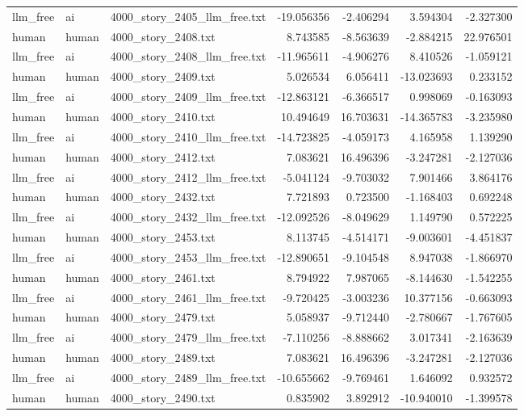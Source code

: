 \begin{longtable}{lllrrrr}
llm\_free & ai & 4000\_story\_2405\_llm\_free.txt & -19.056356 & -2.406294 & 3.594304 & -2.327300 \\
human & human & 4000\_story\_2408.txt & 8.743585 & -8.563639 & -2.884215 & 22.976501 \\
llm\_free & ai & 4000\_story\_2408\_llm\_free.txt & -11.965611 & -4.906276 & 8.410526 & -1.059121 \\
human & human & 4000\_story\_2409.txt & 5.026534 & 6.056411 & -13.023693 & 0.233152 \\
llm\_free & ai & 4000\_story\_2409\_llm\_free.txt & -12.863121 & -6.366517 & 0.998069 & -0.163093 \\
human & human & 4000\_story\_2410.txt & 10.494649 & 16.703631 & -14.365783 & -3.235980 \\
llm\_free & ai & 4000\_story\_2410\_llm\_free.txt & -14.723825 & -4.059173 & 4.165958 & 1.139290 \\
human & human & 4000\_story\_2412.txt & 7.083621 & 16.496396 & -3.247281 & -2.127036 \\
llm\_free & ai & 4000\_story\_2412\_llm\_free.txt & -5.041124 & -9.703032 & 7.901466 & 3.864176 \\
human & human & 4000\_story\_2432.txt & 7.721893 & 0.723500 & -1.168403 & 0.692248 \\
llm\_free & ai & 4000\_story\_2432\_llm\_free.txt & -12.092526 & -8.049629 & 1.149790 & 0.572225 \\
human & human & 4000\_story\_2453.txt & 8.113745 & -4.514171 & -9.003601 & -4.451837 \\
llm\_free & ai & 4000\_story\_2453\_llm\_free.txt & -12.890651 & -9.104548 & 8.947038 & -1.866970 \\
human & human & 4000\_story\_2461.txt & 8.794922 & 7.987065 & -8.144630 & -1.542255 \\
llm\_free & ai & 4000\_story\_2461\_llm\_free.txt & -9.720425 & -3.003236 & 10.377156 & -0.663093 \\
human & human & 4000\_story\_2479.txt & 5.058937 & -9.712440 & -2.780667 & -1.767605 \\
llm\_free & ai & 4000\_story\_2479\_llm\_free.txt & -7.110256 & -8.888662 & 3.017341 & -2.163639 \\
human & human & 4000\_story\_2489.txt & 7.083621 & 16.496396 & -3.247281 & -2.127036 \\
llm\_free & ai & 4000\_story\_2489\_llm\_free.txt & -10.655662 & -9.769461 & 1.646092 & 0.932572 \\
human & human & 4000\_story\_2490.txt & 0.835902 & 3.892912 & -10.940010 & -1.399578 \\

\end{longtable}
